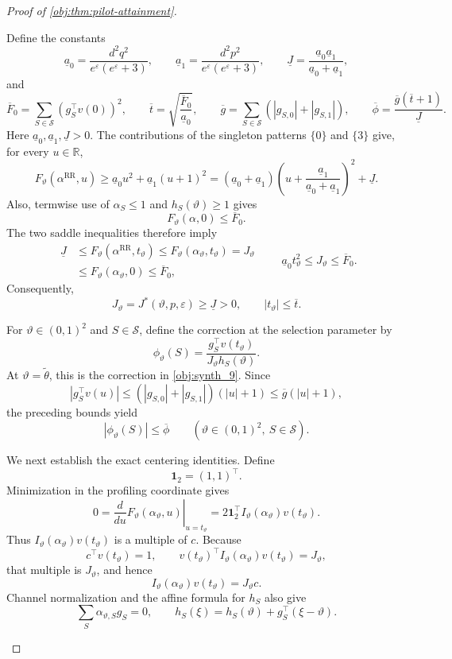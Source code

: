 \begin{proof}[Proof of \cref{obj:thm:pilot-attainment}]
\begin{enumerate}
Define the constants
\[
\underline a_0=\frac{d^2q^2}{e^\varepsilon(e^\varepsilon+3)},
\qquad
\underline a_1=\frac{d^2p^2}{e^\varepsilon(e^\varepsilon+3)},
\qquad
\underline J=\frac{\underline a_0\underline a_1}
{\underline a_0+\underline a_1},
\]
and
\[
\overline F_0=\sum_{S\in\mathcal S}(g_S^\top v(0))^2,
\qquad
\overline t=\sqrt{\frac{\overline F_0}{\underline a_0}},
\qquad
\overline g=\sum_{S\in\mathcal S}(|g_{S,0}|+|g_{S,1}|),
\qquad
\overline\phi=\frac{\overline g(\overline t+1)}{\underline J}.
\]
Here \(\underline a_0,\underline a_1,\underline J>0\). The contributions of the singleton patterns \(\{0\}\) and \(\{3\}\) give, for every \(u\in\mathbb R\),
\[
F_\vartheta(\alpha^{\mathrm{RR}},u)
\ge \underline a_0u^2+\underline a_1(u+1)^2
=(\underline a_0+\underline a_1)
\left(u+\frac{\underline a_1}{\underline a_0+\underline a_1}\right)^2
+\underline J.
\]
Also, termwise use of \(\alpha_S\le1\) and \(h_S(\vartheta)\ge1\) gives
\[
F_\vartheta(\alpha,0)\le\overline F_0.
\]
The two saddle inequalities therefore imply
\[
\begin{aligned}
\underline J
&\le F_\vartheta(\alpha^{\mathrm{RR}},t_\vartheta)
\le F_\vartheta(\alpha_\vartheta,t_\vartheta)
=J_\vartheta\\
&\le F_\vartheta(\alpha_\vartheta,0)
\le\overline F_0,
\end{aligned}
\qquad
\underline a_0t_\vartheta^2\le J_\vartheta\le\overline F_0.
\]
Consequently,
\[
J_\vartheta=J^*(\vartheta,p,\varepsilon)\ge\underline J>0,
\qquad |t_\vartheta|\le\overline t.
\]

For \(\vartheta\in(0,1)^2\) and \(S\in\mathcal S\), define the correction at the selection parameter by
\[
\phi_\vartheta(S)
=\frac{g_S^\top v(t_\vartheta)}
{J_\vartheta h_S(\vartheta)}.
\]
At \(\vartheta=\widetilde\theta\), this is the correction in \cref{obj:synth_9}. Since
\[
|g_S^\top v(u)|
\le (|g_{S,0}|+|g_{S,1}|)(|u|+1)
\le\overline g(|u|+1),
\]
the preceding bounds yield
\[
|\phi_\vartheta(S)|\le\overline\phi
\qquad
(\vartheta\in(0,1)^2,\ S\in\mathcal S).
\]

We next establish the exact centering identities. Define
\[
\mathbf1_2=(1,1)^\top.
\]
Minimization in the profiling coordinate gives
\[
0=\left.\frac{d}{du}F_\vartheta(\alpha_\vartheta,u)
\right|_{u=t_\vartheta}
=2\mathbf1_2^\top I_\vartheta(\alpha_\vartheta)v(t_\vartheta).
\]
Thus \(I_\vartheta(\alpha_\vartheta)v(t_\vartheta)\) is a multiple of \(c\). Because
\[
c^\top v(t_\vartheta)=1,
\qquad
v(t_\vartheta)^\top I_\vartheta(\alpha_\vartheta)v(t_\vartheta)
=J_\vartheta,
\]
that multiple is \(J_\vartheta\), and hence
\[
I_\vartheta(\alpha_\vartheta)v(t_\vartheta)=J_\vartheta c.
\]
Channel normalization and the affine formula for \(h_S\) also give
\[
\sum_S\alpha_{\vartheta,S}g_S=0,
\qquad
h_S(\xi)=h_S(\vartheta)+g_S^\top(\xi-\vartheta).
\]


\end{enumerate}
\end{proof}
